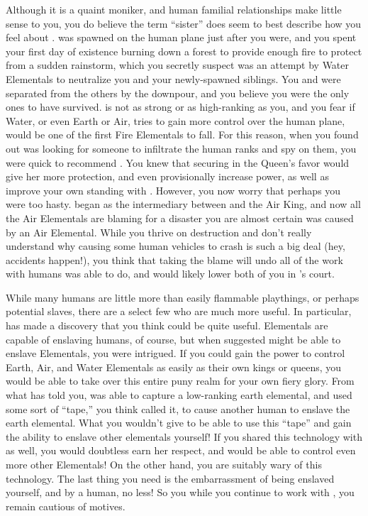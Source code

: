 \documentclass[char]{elementals}
\begin{document}
Although it is a quaint moniker, and human familial relationships make little sense to you, you do believe the term ``sister'' does seem to best describe how you feel about \cJuliet{}.  \cJuliet{\They} was spawned on the human plane just after you were, and you spent your first day of existence burning down a forest to provide enough fire to protect \cJuliet{\them} from a sudden rainstorm, which you secretly suspect was an attempt by Water Elementals to neutralize you and your newly-spawned siblings.  You and \cJuliet{} were separated from the others by the downpour, and you believe you were the only ones to have survived. \cJuliet{\they} is not as strong or as high-ranking as you, and you fear if Water, or even Earth or Air, tries to gain more control over the human plane, \cJuliet{\they} would be one of the first Fire Elementals to fall. For this reason, when you found out \cQueen{} was looking for someone to infiltrate the human ranks and spy on them, you were quick to recommend \cJuliet{}.  You knew that securing \cJuliet{\them} in the Queen's favor would give her more protection, and even provisionally increase \cJuliet{\their} power, as well as improve your own standing with \cQueen{}.  However, you now worry that perhaps you were too hasty.  \cJuliet{} began as the intermediary between \cQueen{} and the Air King, and now all the Air Elementals are blaming \cJuliet{\them} for a disaster you are almost certain was caused by an Air Elemental.  While you thrive on destruction and don't really understand why causing some human vehicles to crash is such a big deal (hey, accidents happen!), you think that \cJuliet{} taking the blame will undo all of the work with humans \cJuliet{\they} was able to do, and would likely lower both of you in \cQueen{}'s court.

While many humans are little more than easily flammable playthings, or perhaps potential slaves, there are a select few who are much more useful.  In particular, \cMS{\intro} has made a discovery that you think could be quite useful.  Elementals are capable of enslaving humans, of course, but when \cMS{} suggested  might be able to enslave Elementals, you were intrigued.  If you could gain the power to control Earth, Air, and Water Elementals as easily as their own kings or queens, you would be able to take over this entire puny realm for your own fiery glory.  From what \cMS{} has told you, \cMS{\they} was able to capture a low-ranking earth elemental, and used some sort of ``tape,'' you think  called it, to cause another human to enslave the earth elemental.  What you wouldn't give to be able to use this ``tape'' and gain the ability to enslave other elementals yourself!  If you shared this technology with \cQueen{} as well, you would doubtless earn her respect, and  would be able to control even more other Elementals!  On the other hand, you are suitably wary of this technology.  The last thing you need is the embarrassment of being enslaved yourself, and by a human, no less!  So you while you continue to work with \cMS{}, you remain cautious of \cMS{\their} motives.
\end{document}
